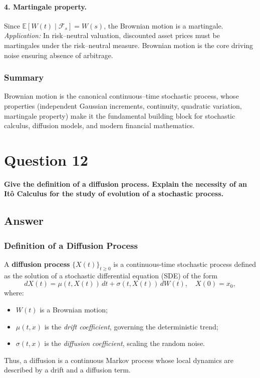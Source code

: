 \documentclass[12pt,a4paper]{book}
\theoremstyle{remark}
\newcommand{\EE}{\mathbb{E}}          %
\newcommand{\F}{\mathcal{F}}          %
\begin{document}
\paragraph{4. Martingale property.}
Since $\EE[W(t)\mid\F_s]=W(s)$, the Brownian motion is a martingale.  
\emph{Application:} In risk–neutral valuation, discounted asset prices must be martingales under the risk–neutral measure. Brownian motion is the core driving noise ensuring absence of arbitrage.

\subsubsection*{Summary}
Brownian motion is the canonical continuous–time stochastic process, whose properties (independent Gaussian increments, continuity, quadratic variation, martingale property) make it the fundamental building block for stochastic calculus, diffusion models, and modern financial mathematics.




\newpage
\section{Question 12}
\textbf{Give the definition of a diffusion process. Explain the necessity of an Itô Calculus for the study of evolution of a stochastic process.}

\subsection*{Answer}

\subsubsection*{Definition of a Diffusion Process}
A \textbf{diffusion process} $\{X(t)\}_{t\ge 0}$ is a continuous-time stochastic process defined as the solution of a stochastic differential equation (SDE) of the form
\[
dX(t) = \mu(t,X(t))\,dt + \sigma(t,X(t))\,dW(t), \quad X(0)=x_0,
\]
where:
\begin{itemize}
    \item $W(t)$ is a Brownian motion;
    \item $\mu(t,x)$ is the \emph{drift coefficient}, governing the deterministic trend;
    \item $\sigma(t,x)$ is the \emph{diffusion coefficient}, scaling the random noise.
\end{itemize}
Thus, a diffusion is a continuous Markov process whose local dynamics are described by a drift and a diffusion term.
\end{document}
